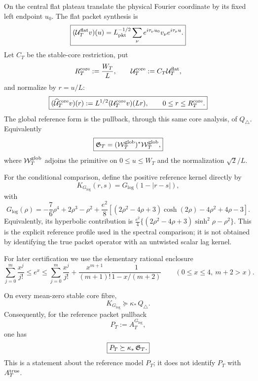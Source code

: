 On the central flat plateau translate the physical Fourier coordinate by its
fixed left endpoint $u_0$.  The flat packet synthesis is
\begin{equation}
\boxed{
(\mathcal U_T^{\rm flat}v)(u)
=L_{\rm pkt}^{-1/2}\sum_\nu
 e^{i\tau_\nu u_0}v_\nu e^{i\tau_\nu u}.
}
\label{eq:explicit-flat-analysis}
\end{equation}
Let $C_T$ be the stable-core restriction, put
\[
R_T^{\rm core}:=\frac{W_T}{L},
\qquad
\mathcal U_T^{\rm core}:=C_T\mathcal U_T^{\rm flat},
\]
and normalize by $r=u/L$:
\begin{equation}
\boxed{
(\widehat{\mathcal U}_T^{\rm core}v)(r)
:=L^{1/2}(\mathcal U_T^{\rm core}v)(Lr),
\qquad 0\le r\le R_T^{\rm core}.
}
\label{eq:normalized-core-analysis}
\end{equation}
The global reference form is the pullback, through this same core analysis,
of $Q_\triangle$.  Equivalently
\begin{equation}
\boxed{
\mathfrak G_T=(\mathcal W_T^{\rm glob})^*\mathcal W_T^{\rm glob},
}
\label{eq:global-reference-Gram}
\end{equation}
where $\mathcal W_T^{\rm glob}$ adjoins the primitive on
$0\le u\le W_T$ and the normalization $\sqrt2/L$.

For the conditional comparison, define the positive reference kernel directly
by
\[
K_{G_{\log}}(r,s)=G_{\log}(1-|r-s|),
\]
with
\begin{equation}
\boxed{
G_{\log}(\rho)
=-\frac76\rho^4+2\rho^3-\rho^2
+\frac{e^2}{8}\left[
(2\rho^2-4\rho+3)\cosh(2\rho)-4\rho^2+4\rho-3
\right].
}
\label{eq:Glog-closed}
\end{equation}
Equivalently, its hyperbolic contribution is
$\frac{e^2}{4}\{(2\rho^2-4\rho+3)\sinh^2\rho-\rho^2\}$.
This is the explicit reference profile used in the spectral comparison; it is
not obtained by identifying the true packet operator with an untwisted scalar
lag kernel.

For later certification we use the elementary rational enclosure
\begin{equation}
\sum_{j=0}^{m}\frac{x^j}{j!}
\le e^x\le
\sum_{j=0}^{m}\frac{x^j}{j!}
+\frac{x^{m+1}}{(m+1)!}\frac1{1-x/(m+2)}
\qquad(0\le x\le4,\ m+2>x).
\label{eq:exp-rational-bound}
\end{equation}

\begin{proposition}
\label{prop:model-floor}
On every mean-zero stable core fibre,
\begin{equation}
\boxed{
K_{G_{\log}}\succeq\kappa_*\,Q_\triangle.
}
\label{eq:model-floor}
\end{equation}
Consequently, for the reference packet pullback
\[
P_T:=A_T^{G_{\log}},
\]
one has
\begin{equation}
\boxed{P_T\succeq\kappa_*\,\mathfrak G_T.}
\label{eq:logonly-model-floor}
\end{equation}
This is a statement about the reference model $P_T$; it does not identify
$P_T$ with $A_T^{\rm true}$.
\end{proposition}

